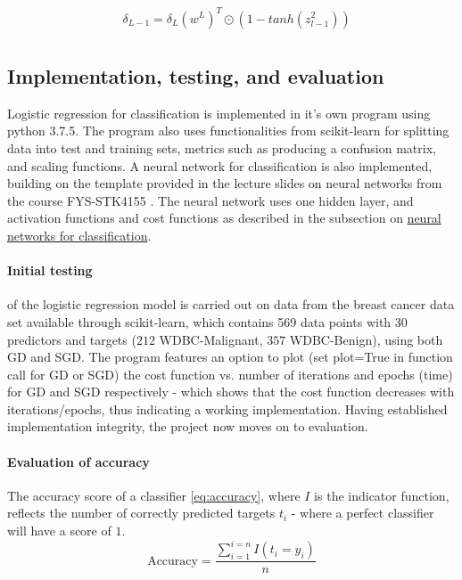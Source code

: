 \documentclass[%
oneside,                 %
final,                   %
10pt]{article}
\begin{document}
\begin{align*}
&\delta_{L-1}=\delta_L(w^{L})^T    \odot (1-tanh(z_{l-1}^2)) \\ 
\end{align*}

\subsection{Implementation, testing, and evaluation}
Logistic regression for classification is implemented in it's own program using python 3.7.5. The program also uses functionalities from scikit-learn \cite{sklearn} for splitting data into test and training sets, metrics such as producing a confusion matrix, and scaling functions. A neural network for classification is also implemented, building on the template provided in the lecture slides on neural networks from the course FYS-STK4155 \cite{MHJ_NN}. The neural network uses one hidden layer, and activation functions and cost functions as described in the subsection on \hyperref[Section_M_NNclass]{neural networks for classification}. 

\paragraph{Initial testing} of the logistic regression model is carried out on data from the breast cancer data set available through scikit-learn, which contains 569 data points with 30 predictors and targets ($212$ WDBC-Malignant, $ 357$
WDBC-Benign), using both GD and SGD. The program features an option to plot (set plot=True in function call for GD or SGD) the cost function vs. number of iterations and epochs (time) for GD and SGD respectively - which shows that the cost function decreases with iterations/epochs, thus indicating a working implementation.  Having established implementation integrity, the project now moves on to evaluation.

\paragraph{Evaluation of accuracy}
The accuracy score of a classifier \eqref{eq:accuracy}, where $I$ is the indicator function, reflects the number of correctly predicted targets $t_i$ - where a perfect classifier will have a score of $1$. 
\begin{equation}
\text{Accuracy}=\frac{\sum_{i=1}^{i=n}I(t_i=y_i)}{n}
\label{eq:accuracy}
\end{equation}
\end{document}
